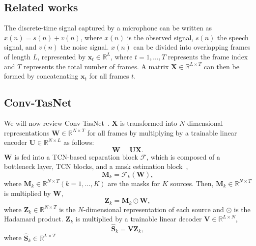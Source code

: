 \documentclass[a4paper]{article}
\begin{document}
\begin{spacing}{0.9}
\section{Related works}

The discrete-time signal captured by a microphone can be written as $x(n) = s(n)+v(n)$, 
where $x(n)$ is the observed signal, $s(n)$ the speech signal, and $v(n)$ the noise signal.
$x(n)$ can be divided into overlapping frames of length $L$, represented by $\mathbf{x}_t\in\mathbb{R}^{L}$,
where $t = 1,\dots,T$ represents the frame index and $T$ represents the total number of frames.
A matrix $\mathbf{X}\in \mathbb{R}^{L\times T}$ can then be formed by concatenating $\mathbf{x}_t$ for all frames $t$.

\subsection{Conv-TasNet}
We will now review Conv-TasNet~\cite{luo2019conv}.
$\mathbf{X}$ is transformed into $N$-dimensional representations  $\mathbf{W}\in\mathbb{R}^{N\times T}$ for all frames by multiplying by a trainable linear encoder $\mathbf{U}\in \mathbb{R}^{N\times L}$ as follows:
\begin{equation}
\mathbf{W} = \mathbf{U}\mathbf{X}.
\label{eq:encoder}
\end{equation}
$\mathbf{W}$ is fed into a TCN-based separation block $\mathcal{F}$, which is composed of a bottleneck layer, TCN blocks, and a mask estimation block~\cite{luo2019conv}, 
\begin{equation}
\mathbf{M}_k = \mathcal{F}_k(\mathbf{W}),
\label{eq:tcn}
\end{equation}
where $\mathbf{M}_k\in \mathbb{R}^{N\times T} (k=1,\dots,K)$
are the masks for $K$ sources.
Then, $\mathbf{M}_k\in \mathbb{R}^{N\times T}$
is multiplied by $\mathbf{W}$,
\begin{equation}
\mathbf{Z}_k = \mathbf{M}_k\odot\mathbf{W},
\label{eq:masking}
\end{equation}
where $\mathbf{Z}_k\in \mathbb{R}^{N\times T}$ is the $N$-dimensional representation of each source and $\odot$ is the Hadamard product.
$\mathbf{Z}_k$ is multiplied by a trainable linear decoder $\mathbf{V}\in \mathbb{R}^{L\times N}$,
\begin{equation}
\hat{\mathbf{S}}_k = \mathbf{V}\mathbf{Z}_k,
\label{eq:decorder}
\end{equation}
where $\hat{\mathbf{S}}_k\in \mathbb{R}^{L\times T}$

\end{spacing}
\end{document}
